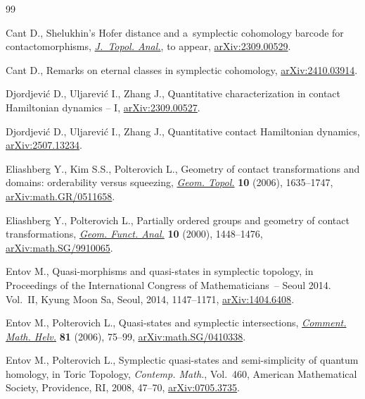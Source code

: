 \begin{thebibliography}{99}
\footnotesize\itemsep=0pt

Cant D., Shelukhin's Hofer distance and a~symplectic cohomology barcode for
 contactomorphisms,
 \href{https://doi.org/10.1142/S179352532650010X}{\textit{J.~Topol. Anal.}}, {t}o appear, \href{http://arxiv.org/abs/2309.00529}{arXiv:2309.00529}.

Cant D., Remarks on eternal classes in symplectic cohomology,
 \href{http://arxiv.org/abs/2410.03914}{arXiv:2410.03914}.


Djordjevi\'c D., Uljarevi\'c I., Zhang J., Quantitative characterization in
 contact {H}amiltonian dynamics -- {I},
 \href{http://arxiv.org/abs/2309.00527}{arXiv:2309.00527}.

Djordjevi\'c D., Uljarevi\'c I., Zhang J., Quantitative contact {H}amiltonian
 dynamics, \href{http://arxiv.org/abs/2507.13234}{arXiv:2507.13234}.

Eliashberg Y., Kim S.S., Polterovich L., Geometry of contact transformations
 and domains: orderability versus squeezing,
 \href{https://doi.org/10.2140/gt.2006.10.1635}{\textit{Geom. Topol.}}
 \textbf{10} (2006), 1635--1747,
 \href{http://arxiv.org/abs/math.GR/0511658}{arXiv:math.GR/0511658}.

Eliashberg Y., Polterovich L., Partially ordered groups and geometry of contact
 transformations, \href{https://doi.org/10.1007/PL00001656}{\textit{Geom.
 Funct. Anal.}} \textbf{10} (2000), 1448--1476,
 \href{http://arxiv.org/abs/math.SG/9910065}{arXiv:math.SG/9910065}.

Entov M., Quasi-morphisms and quasi-states in symplectic topology, in
 Proceedings of the {I}nternational {C}ongress of {M}athematicians~-- {S}eoul
 2014. {V}ol.~{II}, Kyung Moon Sa, Seoul, 2014, 1147--1171,
 \href{http://arxiv.org/abs/1404.6408}{arXiv:1404.6408}.

Entov M., Polterovich L., Quasi-states and symplectic intersections,
 \href{https://doi.org/10.4171/CMH/43}{\textit{Comment. Math. Helv.}}
 \textbf{81} (2006), 75--99,
 \href{http://arxiv.org/abs/math.SG/0410338}{arXiv:math.SG/0410338}.

Entov M., Polterovich L., Symplectic quasi-states and semi-simplicity of
 quantum homology, in Toric Topology, \textit{Contemp. Math.}, Vol.~460,
American Mathematical Society,
 Providence, RI, 2008, 47--70,
 \href{http://arxiv.org/abs/0705.3735}{arXiv:0705.3735}.


\end{thebibliography}
